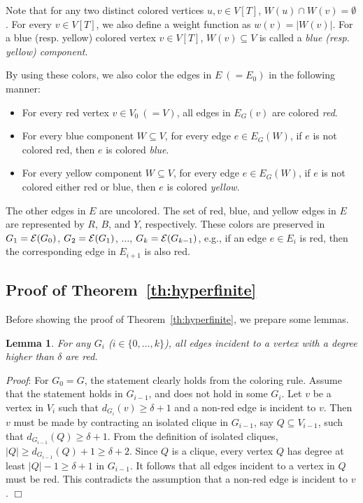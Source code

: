 \documentclass[11pt]{article}
\newtheorem{lm}[thm]{Lemma}
\newcommand{\qed}{\hspace*{\fill} $\Box$}
\begin{document}
Note that for any two distinct colored vertices $u,v \in V[T]$, 
$W(u) \cap W(v) = \emptyset$. 
For every $v \in V[T]$, we also define a weight function as 
$w(v) = |W(v)|$. 
For a blue (resp. yellow) colored vertex $v \in V[T]$, 
$W(v) \subseteq V$ is called a {\em blue (resp. yellow) component}. 


By using these colors, 
we also color the edges in $E~(=E_0)$ in the following manner: 
\begin{itemize}
\item For every red vertex $v \in V_0~(=V)$, all edges in $E_G(v)$ are colored {\em red}. 
\item For every blue component $W \subseteq V$, for every edge $e \in E_G(W)$,  
if $e$ is not colored red, then $e$ is colored {\em blue}. 
\item For every yellow component $W \subseteq V$, for every edge $e \in E_G(W)$,  
if $e$ is not colored either red or blue, 
then $e$ is colored {\em yellow}. 
\end{itemize}







The other edges in $E$ are uncolored. 
The set of red, blue, and yellow edges in $E$ 
are represented by $R$, $B$, and $Y$, respectively. 
These colors are preserved in 
$G_1 ={\cal E}(G_0)$, $G_2 ={\cal E}(G_1)$, $\ldots$, $G_k ={\cal E}(G_{k-1})$, 
e.g., if an edge $e \in E_i$ is red, then the corresponding edge in $E_{i+1}$ is also red. 



\subsection{Proof of Theorem~\ref{th:hyperfinite}}

Before showing the proof of Theorem~\ref{th:hyperfinite}, we prepare some lemmas. 


\begin{lm}\label{lm:high_degree_is_red}
For any $G_i$ ($i \in \{ 0, \ldots, k \}$), 
all edges incident to a vertex with a degree higher than $\delta$ are red.  
\end{lm}


\noindent
{\em Proof}: 
For $G_0 =G$, the statement clearly holds from the coloring rule. 
Assume that the statement holds in $G_{i-1}$, and 
does not hold in some $G_i$. 
Let $v$ be a vertex in $V_{i}$ such that $d_{G_{i}}(v) \geq \delta +1$ 
and a non-red edge is incident to $v$. 
Then $v$ must be made by contracting an 
isolated clique  in $G_{i-1}$, say $Q \subseteq V_{i-1}$,  
such that $d_{G_{i-1}}(Q) \geq \delta+1$. 
From the definition of isolated cliques, 
$|Q| \geq  d_{G_{i-1}}(Q) +1 \geq \delta +2$. 
Since $Q$ is a clique, every vertex $Q$ 
has degree at least $|Q|-1 \geq \delta +1$ in $G_{i-1}$. 
It follows that all edges incident to a vertex in $Q$ must be red. 
This contradicts the assumption that a non-red edge is incident to $v$. \qed
\end{document}
